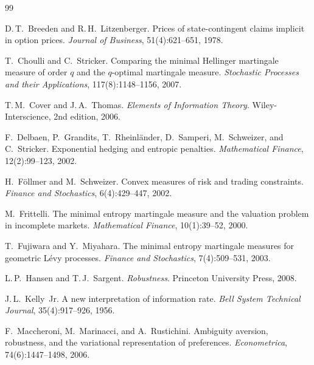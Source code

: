 \documentclass[11pt]{article}
\theoremstyle{definition}
\theoremstyle{remark}
\begin{document}

\begin{thebibliography}{99}

D.\,T.~Breeden and R.\,H.~Litzenberger.
\newblock Prices of state-contingent claims implicit in option prices.
\newblock \emph{Journal of Business}, 51(4):621--651, 1978.

T.~Choulli and C.~Stricker.
\newblock Comparing the minimal Hellinger martingale measure of order
$q$ and the $q$-optimal martingale measure.
\newblock \emph{Stochastic Processes and their Applications},
117(8):1148--1156, 2007.

T.\,M.~Cover and J.\,A.~Thomas.
\newblock \emph{Elements of Information Theory}.
\newblock Wiley-Interscience, 2nd edition, 2006.

F.~Delbaen, P.~Grandits, T.~Rheinl\"ander, D.~Samperi, M.~Schweizer,
and C.~Stricker.
\newblock Exponential hedging and entropic penalties.
\newblock \emph{Mathematical Finance}, 12(2):99--123, 2002.

H.~F\"ollmer and M.~Schweizer.
\newblock Convex measures of risk and trading constraints.
\newblock \emph{Finance and Stochastics}, 6(4):429--447, 2002.

M.~Frittelli.
\newblock The minimal entropy martingale measure and the valuation
problem in incomplete markets.
\newblock \emph{Mathematical Finance}, 10(1):39--52, 2000.

T.~Fujiwara and Y.~Miyahara.
\newblock The minimal entropy martingale measures for geometric L\'evy
processes.
\newblock \emph{Finance and Stochastics}, 7(4):509--531, 2003.

L.\,P.~Hansen and T.\,J.~Sargent.
\newblock \emph{Robustness}.
\newblock Princeton University Press, 2008.

J.\,L.~Kelly~Jr.
\newblock A new interpretation of information rate.
\newblock \emph{Bell System Technical Journal}, 35(4):917--926, 1956.

F.~Maccheroni, M.~Marinacci, and A.~Rustichini.
\newblock Ambiguity aversion, robustness, and the variational
representation of preferences.
\newblock \emph{Econometrica}, 74(6):1447--1498, 2006.


\end{thebibliography}
\end{document}
